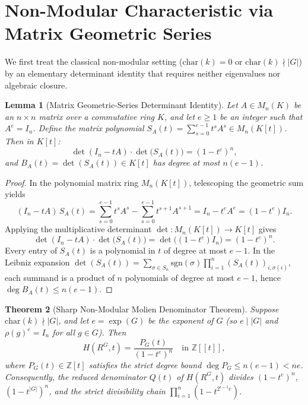 \documentclass[11pt]{article}
\newtheorem{theorem}{Theorem}[section]
\newtheorem{lemma}[theorem]{Lemma}
\theoremstyle{definition}
\theoremstyle{remark}
\begin{document}
\section{Non-Modular Characteristic via Matrix Geometric Series}

We first treat the classical non-modular setting ($\mathrm{char}(k) = 0$ or $\mathrm{char}(k) \nmid |G|$) by an elementary determinant identity that requires neither eigenvalues nor algebraic closure.

\begin{lemma}[Matrix Geometric-Series Determinant Identity]
\label{lem:mat-geom}
Let $A \in M_n(K)$ be an $n \times n$ matrix over a commutative ring $K$, and let $e \ge 1$ be an integer such that $A^e = I_n$. Define the matrix polynomial $S_A(t) = \sum_{s=0}^{e-1} t^s A^s \in M_n(K[t])$. Then in $K[t]$:
\[
\det(I_n - tA) \cdot \det\bigl(S_A(t)\bigr) = (1 - t^e)^n,
\]
and $B_A(t) = \det(S_A(t)) \in K[t]$ has degree at most $n(e - 1)$.
\end{lemma}

\begin{proof}
In the polynomial matrix ring $M_n(K[t])$, telescoping the geometric sum yields
\[
(I_n - tA)\, S_A(t) = \sum_{s=0}^{e-1} t^s A^s - \sum_{s=0}^{e-1} t^{s+1} A^{s+1} = I_n - t^e A^e = (1 - t^e) I_n.
\]
Applying the multiplicative determinant $\det : M_n(K[t]) \to K[t]$ gives
\[
\det(I_n - tA) \cdot \det\bigl(S_A(t)\bigr) = \det\bigl((1 - t^e) I_n\bigr) = (1 - t^e)^n.
\]
Every entry of $S_A(t)$ is a polynomial in $t$ of degree at most $e - 1$. In the Leibniz expansion $\det(S_A(t)) = \sum_{\sigma \in S_n} \mathrm{sgn}(\sigma) \prod_{i=1}^n (S_A(t))_{i,\sigma(i)}$, each summand is a product of $n$ polynomials of degree at most $e - 1$, hence $\deg B_A(t) \le n(e - 1)$.
\end{proof}

\begin{theorem}[Sharp Non-Modular Molien Denominator Theorem]
\label{thm:nonmod}
Suppose $\mathrm{char}(k) \nmid |G|$, and let $e = \exp(G)$ be the exponent of $G$ (so $e \mid |G|$ and $\rho(g)^e = I_n$ for all $g \in G$). Then
\[
H(R^G, t) = \frac{P_G(t)}{(1 - t^e)^n} \quad \text{in } \mathbb{Z}[[t]],
\]
where $P_G(t) \in \mathbb{Z}[t]$ satisfies the strict degree bound $\deg P_G \le n(e - 1) < ne$. Consequently, the reduced denominator $Q(t)$ of $H(R^G, t)$ divides $(1 - t^e)^n$, $(1 - t^{|G|})^n$, and the strict divisibility chain $\prod_{i=1}^n (1 - t^{2^{i-1} e})$.
\end{theorem}
\end{document}
